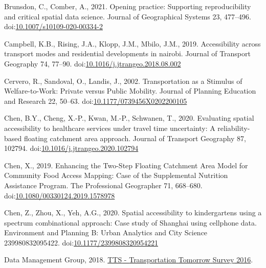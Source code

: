 \documentclass[]{elsarticle} %
\newlength{\cslhangindent}
\newlength{\cslentryspacingunit} %
\newenvironment{CSLReferences}[2] %
 {%
  \setlength{\parindent}{0pt}
  \ifodd #1
  \let\oldpar\par
  \def\par{\hangindent=\cslhangindent\oldpar}
  \fi
  \setlength{\parskip}{#2\cslentryspacingunit}
 }%
 {}
\begin{document}
\begin{CSLReferences}{1}{0}
\leavevmode{}%
Brunsdon, C., Comber, A., 2021. Opening practice: Supporting
reproducibility and critical spatial data science. Journal of
Geographical Systems 23, 477--496.
doi:\href{https://doi.org/10.1007/s10109-020-00334-2}{10.1007/s10109-020-00334-2}

\leavevmode{}%
Campbell, K.B., Rising, J.A., Klopp, J.M., Mbilo, J.M., 2019.
Accessibility across transport modes and residential developments in
nairobi. Journal of Transport Geography 74, 77--90.
doi:\href{https://doi.org/10.1016/j.jtrangeo.2018.08.002}{10.1016/j.jtrangeo.2018.08.002}

\leavevmode{}%
Cervero, R., Sandoval, O., Landis, J., 2002. Transportation as a
{Stimulus} of {Welfare}-to-{Work}: {Private} versus {Public} {Mobility}.
Journal of Planning Education and Research 22, 50--63.
doi:\href{https://doi.org/10.1177/0739456X0202200105}{10.1177/0739456X0202200105}

\leavevmode{}%
Chen, B.Y., Cheng, X.-P., Kwan, M.-P., Schwanen, T., 2020. Evaluating
spatial accessibility to healthcare services under travel time
uncertainty: {A} reliability-based floating catchment area approach.
Journal of Transport Geography 87, 102794.
doi:\href{https://doi.org/10.1016/j.jtrangeo.2020.102794}{10.1016/j.jtrangeo.2020.102794}

\leavevmode{}%
Chen, X., 2019. Enhancing the {Two}-{Step} {Floating} {Catchment} {Area}
{Model} for {Community} {Food} {Access} {Mapping}: {Case} of the
{Supplemental} {Nutrition} {Assistance} {Program}. The Professional
Geographer 71, 668--680.
doi:\href{https://doi.org/10.1080/00330124.2019.1578978}{10.1080/00330124.2019.1578978}

\leavevmode{}%
Chen, Z., Zhou, X., Yeh, A.G., 2020. Spatial accessibility to
kindergartens using a spectrum combinational approach: {Case} study of
{Shanghai} using cellphone data. Environment and Planning B: Urban
Analytics and City Science 239980832095422.
doi:\href{https://doi.org/10.1177/2399808320954221}{10.1177/2399808320954221}

\leavevmode{}%
Data Management Group, 2018.
\href{http://dmg.utoronto.ca/transportation-tomorrow-survey/tts-introduction}{{TTS}
- {Transportation} {Tomorrow} {Survey} 2016}.


\end{CSLReferences}
\end{document}

